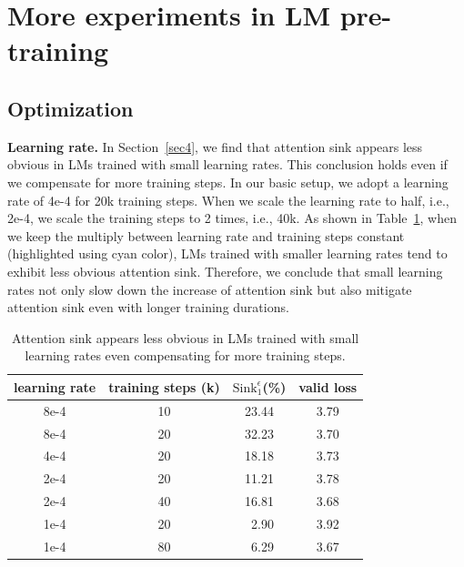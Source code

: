 \clearpage
\section{More experiments in LM pre-training}\label{appendix_model}

\subsection{Optimization} 

\textbf{Learning rate.} In Section~\ref{sec4}, we find that attention sink appears less obvious in LMs trained with small learning rates. This conclusion holds even if we compensate for more training steps. In our basic setup, we adopt a learning rate of 4e-4 for 20k training steps. When we scale the learning rate to half, i.e., 2e-4, we scale the training steps to 2 times, i.e., 40k.  As shown in Table~\ref{lr}, when we keep the multiply between learning rate and training steps constant (highlighted using cyan color), LMs trained with smaller learning rates tend to exhibit less obvious attention sink. Therefore, we conclude that small learning rates not only slow down the increase of attention sink but also mitigate attention sink even with longer training durations.

\begin{table}[htbp]
\caption{Attention sink appears less obvious in LMs trained with small learning rates even compensating for more training steps.}
\vspace{-.2cm}
\begin{center}
\begin{tabular}{c|ccc}
\toprule
learning rate & training steps (k) & $\textrm{Sink}_1^{\epsilon}$(\%)  & valid loss \\
\midrule
\rowcolor{LightCyan}
8e-4 & 10 & 23.44 & 3.79 \\
8e-4 & 20 & 32.23  & 3.70 \\
\rowcolor{LightCyan}
4e-4 & 20 & 18.18 &  3.73 \\
2e-4 & 20 & 11.21 & 3.78 \\
\rowcolor{LightCyan}
2e-4 & 40 & 16.81 & 3.68 \\ 
1e-4 & 20 & \,\,\,2.90 & 3.92\\
\rowcolor{LightCyan}
1e-4 & 80 & \,\,\,6.29 & 3.67 \\
\bottomrule
\end{tabular}
\end{center}
\vspace{-.2cm}
\label{lr}
\end{table}

